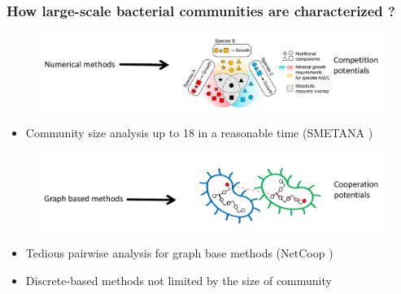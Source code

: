 \documentclass[8pt,usenames,dvipsnames]{beamer}
\begin{document}
\begin{frame}
\frametitle{How large-scale bacterial communities are characterized ?}
\begin{figure}
\includegraphics[width=\textwidth]{figures/sota-num.pdf}
\end{figure}
\begin{block}{}
\begin{itemize}
\item Community size analysis up to 18 \normalsize in a reasonable time (SMETANA  \tiny \cite{Zelezniak2015})
\end{itemize}
\end{block}
\begin{figure}
\includegraphics[width=\textwidth]{figures/sota-discrete.pdf}
\end{figure}
\begin{block}{}
\begin{itemize}
\item Tedious pairwise analysis for graph base methods (NetCoop \tiny \cite{Levy2015} \normalsize )
\item Discrete-based methods not limited by the size of community 
\end{itemize}
\end{block}
\end{frame}
\end{document}
